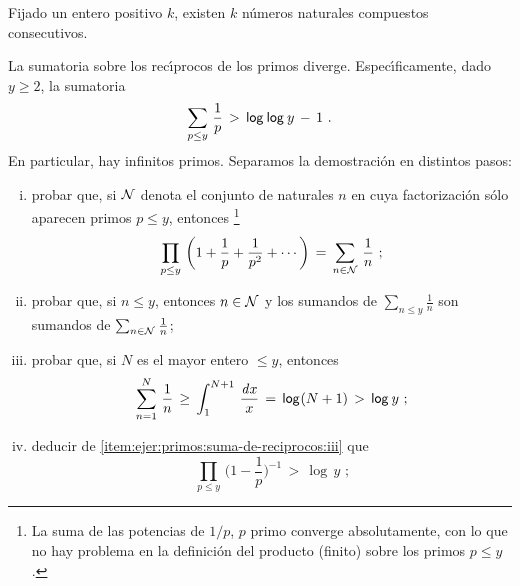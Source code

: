 \begin{ejerPrimos}
	Fijado un entero positivo $k$, existen $k$ n\'umeros naturales
	compuestos consecutivos.%
\end{ejerPrimos}

\begin{ejerPrimos}\label{ejer:primos:suma-de-reciprocos-diverge}
	La sumatoria sobre los rec\'{\i}procos de los primos diverge.
	Espec\'{\i}ficamente, dado $y\geq 2$, la sumatoria
	\begin{equation}
		\label{eq:ejer:primos:suma-de-reciprocos}
		\sum_{p\leq y}\,\frac 1{p}\,>\,\llog\,y\,-\,1
		\text{ .}
	\end{equation}
	En particular, hay infinitos primos.
	Separamos la demostraci\'on en distintos pasos:
	\begin{enumerate}[(i)]
		\item\label{item:ejer:primos:suma-de-reciprocos:i}
			probar que, si $\cal N$ denota el conjunto de
			naturales $n$ en cuya factorizaci\'on s\'olo
			aparecen primos $p\leq y$, entonces%
			\footnote{
				La suma de las potencias de $1/p$, $p$ primo
				converge absolutamente, con lo que no hay
				problema en la definici\'on del producto
				(finito) sobre los primos $p\leq y$.
			}
			\begin{displaymath}
				\prod_{p\leq y}\,\bigg(
					1+\frac 1{p}+\frac 1{p^2}+\cdots
					\bigg)
					\,=\,\sum_{n\in\cal N}\,\frac 1{n}
				\text{ ;}
			\end{displaymath}
		\item\label{item:ejer:primos:suma-de-reciprocos:ii}
			probar que, si $n\leq y$, entonces $n\in\cal N$ y
			los sumandos de $\sum_{n\leq y}\frac 1{n}$ son
			sumandos de $\sum_{n\in\cal N}\frac 1{n}$;
		\item\label{item:ejer:primos:suma-de-reciprocos:iii}
			probar que, si $N$ es el mayor entero $\leq y$,
			entonces
			\begin{displaymath}
				\sum_{n=1}^N\,\frac 1{n}\,\geq\,
					\int_1^{N+1}\,\frac{\de x} x\,=\,
					\log(N+1)\,>\,\log\,y
				\text{ ;}
			\end{displaymath}
		\item\label{item:ejer:primos:suma-de-reciprocos:iv}
			deducir de
			\eqref{item:ejer:primos:suma-de-reciprocos:iii} que
			\begin{displaymath}
				\prod_{p\leq y}\,\bigg(1-\frac 1{p}\bigg)^{-1}
					\,>\,\log\,y
				\text{ ;}
			\end{displaymath}

\end{enumerate}
\end{ejerPrimos}
